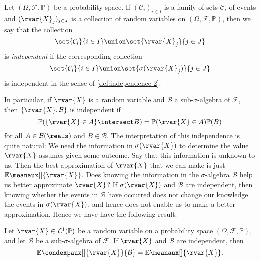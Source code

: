 \documentclass[article, a4paper, 11pt, oneside]{memoir}
\numberwithin{equation}{chapter}
\newcommand{\calB}{\mathcal{B}}
\newcommand{\calF}{\mathcal{F}}
\newcommand{\calC}{\mathcal{C}}
\newcommand{\calL}{\mathcal{L}}
\newcommand{\borel}[1]{\calB(#1)}
\renewcommand{\P}{\mathbb{P}}
\renewcommand{\mean}[2][]{\mathbb{E}\meanaux[#1]{#2}}
\newcommand{\condexp}[3][]{{\mathbb{E}\condexpaux[#1]{#2}{#3}}}
\begin{document}
\begin{definition}
    Let $(\Omega,\calF,\P)$ be a probability space. If $(\calC_i)_{i \in I}$ is a family of sets $\calC_i$ of events and $(\rvar{X}_j)_{j \in J}$ is a collection of random variables on $(\Omega,\calF,\P)$, then we say that the collection
    \begin{equation*}
        \set{\calC_i}{i \in I}
            \union \set{\rvar{X}_j}{j \in J}
    \end{equation*}
    is \emph{independent} if the corresponding collection
    \begin{equation*}
        \set{\calC_i}{i \in I}
            \union \set{\sigma(\rvar{X}_j)}{j \in J}
    \end{equation*}
    is independent in the sense of \cref{def:independence-2}.
\end{definition}
%
In particular, if $\rvar{X}$ is a random variable and $\calB$ a sub-$\sigma$-algebra of $\calF$, then $\{ \rvar{X}, \calB \}$ is independent if
%
\begin{equation*}
    \P( \{\rvar{X} \in A\} \intersect B )
        = \P( \rvar{X} \in A ) \P(B)
\end{equation*}
%
for all $A \in \borel{\reals}$ and $B \in \calB$. The interpretation of this independence is quite natural: We need the information in $\sigma(\rvar{X})$ to determine the value $\rvar{X}$ assumes given some outcome. Say that this information is unknown to us. Then the best approximation of $\rvar{X}$ that we can make is just $\mean{\rvar{X}}$. Does knowing the information in the $\sigma$-algebra $\calB$ help us better approximate $\rvar{X}$? If $\sigma(\rvar{X})$ and $\calB$ are independent, then knowing whether the events in $\calB$ have occurred does not change our knowledge the events in $\sigma(\rvar{X})$, and hence does not enable us to make a better approximation. Hence we have have the following result:

\begin{proposition}
    Let $\rvar{X} \in \calL^1(\P)$ be a random variable on a probability space $(\Omega,\calF,\P)$, and let $\calB$ be a sub-$\sigma$-algebra of $\calF$. If $\rvar{X}$ and $\calB$ are independent, then
    \begin{equation*}
        \condexp{\rvar{X}}{\calB}
            = \mean{\rvar{X}}.
    \end{equation*}
\end{proposition}
\end{document}
